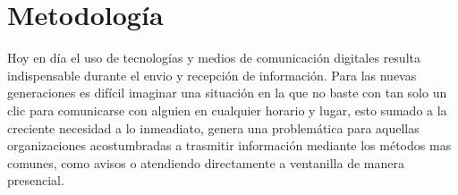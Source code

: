 \chapter{Metodología}

Hoy en día el uso de tecnologías y medios de comunicación digitales resulta indispensable durante el envio y recepción de información. Para las nuevas generaciones es difícil imaginar una situación en la que no baste con tan solo un clic para comunicarse con alguien en cualquier horario y lugar, esto sumado a la creciente necesidad a lo inmeadiato, genera una problemática para aquellas organizaciones acostumbradas a trasmitir información mediante los métodos mas comunes, como avisos o atendiendo directamente a ventanilla de manera presencial.